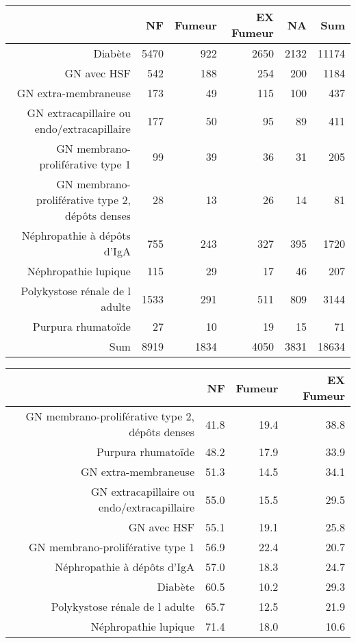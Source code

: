 \documentclass[11pt,a4paper]{article}\usepackage[]{graphicx}\usepackage[]{color}
\begin{document}
\begin{table}[H]
\centering
\begin{tabular}{rrrrrr}
  \hline
 & NF & Fumeur & EX Fumeur & NA & Sum \\ 
  \hline
Diabète & 5470 & 922 & 2650 & 2132 & 11174 \\ 
  GN avec HSF & 542 & 188 & 254 & 200 & 1184 \\ 
  GN extra-membraneuse & 173 & 49 & 115 & 100 & 437 \\ 
  GN extracapillaire ou endo/extracapillaire & 177 & 50 & 95 & 89 & 411 \\ 
  GN membrano-proliférative type 1 & 99 & 39 & 36 & 31 & 205 \\ 
  GN membrano-proliférative type 2, dépôts denses & 28 & 13 & 26 & 14 & 81 \\ 
  Néphropathie à dépôts d'IgA & 755 & 243 & 327 & 395 & 1720 \\ 
  Néphropathie lupique & 115 & 29 & 17 & 46 & 207 \\ 
  Polykystose rénale de l adulte & 1533 & 291 & 511 & 809 & 3144 \\ 
  Purpura rhumatoïde & 27 & 10 & 19 & 15 & 71 \\ 
  Sum & 8919 & 1834 & 4050 & 3831 & 18634 \\ 
   \hline
\end{tabular}
\end{table}
\begin{table}[H]
\centering
\begin{tabular}{rrrr}
  \hline
 & NF & Fumeur & EX Fumeur \\ 
  \hline
GN membrano-proliférative type 2, dépôts denses & 41.8 & 19.4 & 38.8 \\ 
  Purpura rhumatoïde & 48.2 & 17.9 & 33.9 \\ 
  GN extra-membraneuse & 51.3 & 14.5 & 34.1 \\ 
  GN extracapillaire ou endo/extracapillaire & 55.0 & 15.5 & 29.5 \\ 
  GN avec HSF & 55.1 & 19.1 & 25.8 \\ 
  GN membrano-proliférative type 1 & 56.9 & 22.4 & 20.7 \\ 
  Néphropathie à dépôts d'IgA & 57.0 & 18.3 & 24.7 \\ 
  Diabète & 60.5 & 10.2 & 29.3 \\ 
  Polykystose rénale de l adulte & 65.7 & 12.5 & 21.9 \\ 
  Néphropathie lupique & 71.4 & 18.0 & 10.6 \\ 
   \hline
\end{tabular}
\end{table}
\end{document}
